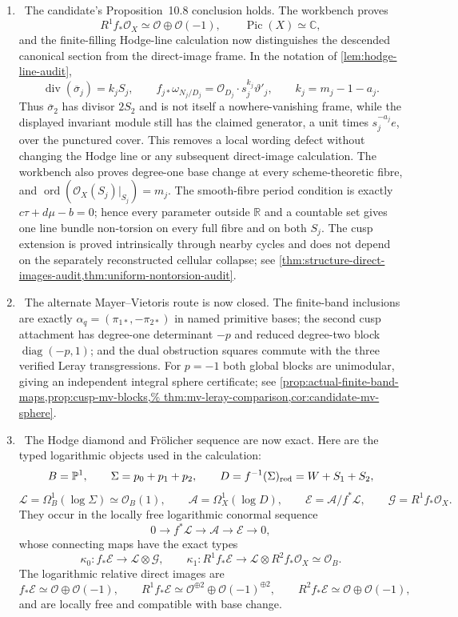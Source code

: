 \begin{enumerate}[leftmargin=1.8em]
\item \Verified\ The candidate's Proposition~10.8 conclusion holds.  The
workbench proves
\[
R^1f_*\mathcal O_X\simeq\mathcal O\oplus\mathcal O(-1),\qquad
\operatorname{Pic}(X)\simeq\mathbb C,
\]
and the finite-filling Hodge-line calculation now distinguishes the descended
canonical section from the direct-image frame.  In the notation of
\cref{lem:hodge-line-audit},
\[
 \operatorname{div}(\overline\sigma_j)=k_jS_j,
 \qquad
 f_{j*}\omega_{N_j/D_j}
 =\mathcal O_{D_j}\cdot s_j^{k_j}\vartheta'_j,
 \qquad k_j=m_j-1-a_j.
\]
Thus \(\overline\sigma_2\) has divisor \(2S_2\) and is not itself a
nowhere-vanishing frame, while the displayed invariant module still has the
claimed generator, a unit times \(s_j^{-a_j}e\), over the punctured cover.
This removes a local wording defect without changing the Hodge line or any
subsequent direct-image calculation.  The workbench also proves
degree-one base change at every scheme-theoretic fibre, and
\(\operatorname{ord}(\mathcal O_X(S_j)|_{S_j})=m_j\).  The smooth-fibre
period condition is exactly \(c\tau+d\mu-b=0\); hence every parameter
outside \(\mathbb R\) and a countable set gives one line bundle non-torsion
on every full fibre and on both \(S_j\).  The cusp extension is proved
intrinsically through nearby cycles and does not depend on the separately
reconstructed cellular collapse; see
\cref{thm:structure-direct-images-audit,thm:uniform-nontorsion-audit}.

\item \Verified\ The alternate Mayer--Vietoris route is now closed.  The
finite-band inclusions are exactly
$\alpha_q=(\pi_{1*},-\pi_{2*})$ in named primitive bases; the second cusp
attachment has degree-one determinant $-p$ and reduced degree-two block
$\operatorname{diag}(-p,1)$; and the dual obstruction squares commute with
the three verified Leray transgressions.  For $p=-1$ both global blocks are
 unimodular, giving an independent integral sphere certificate; see
 \cref{prop:actual-finite-band-maps,prop:cusp-mv-blocks,%
 thm:mv-leray-comparison,cor:candidate-mv-sphere}.

\item \Verified\ The Hodge diamond and Fr\"olicher sequence are now exact.
Here are the typed logarithmic objects used in the calculation:
\[
 B=\mathbb P^1,\qquad \Sigma=p_0+p_1+p_2,\qquad
 D=f^{-1}(\Sigma)_{\rm red}=W+S_1+S_2,
\]
\[
 \mathcal L=\Omega_B^1(\log\Sigma)\simeq\mathcal O_B(1),\qquad
 \mathcal A=\Omega_X^1(\log D),\qquad
 \mathcal E=\mathcal A/f^*\mathcal L,\qquad
 \mathcal G=R^1f_*\mathcal O_X.
\]
They occur in the locally free logarithmic conormal sequence
\[
 0\longrightarrow f^*\mathcal L\longrightarrow\mathcal A
 \longrightarrow\mathcal E\longrightarrow0,
\]
whose connecting maps have the exact types
\[
 \kappa_0:f_*\mathcal E\longrightarrow\mathcal L\otimes\mathcal G,
 \qquad
 \kappa_1:R^1f_*\mathcal E\longrightarrow
 \mathcal L\otimes R^2f_*\mathcal O_X\simeq\mathcal O_B.
\]
The logarithmic relative direct images are
\[
 f_*\mathcal E\simeq\mathcal O\oplus\mathcal O(-1),\qquad
 R^1f_*\mathcal E\simeq
 \mathcal O^{\oplus2}\oplus\mathcal O(-1)^{\oplus2},\qquad
 R^2f_*\mathcal E\simeq\mathcal O\oplus\mathcal O(-1),
\]
and are locally free and compatible with base change.


\end{enumerate}
